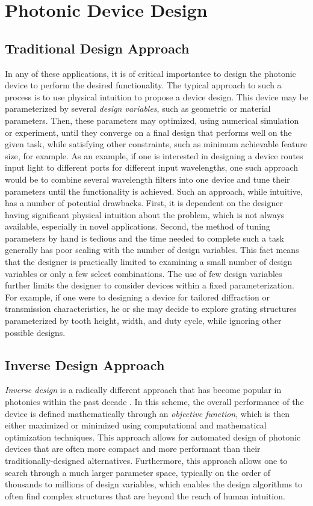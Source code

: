 \section{Photonic Device Design}

\subsection{Traditional Design Approach}

In any of these applications, it is of critical importantce to design the photonic device to perform the desired functionality.
The typical approach to such a process is to use physical intuition to propose a device design.
This device may be parameterized by several \textit{design variables}, such as geometric or material parameters.
Then, these parameters may optimized, using numerical simulation or experiment, until they converge on a final design that performs well on the given task, while satisfying other constraints, such as minimum achievable feature size, for example.
As an example, if one is interested in designing a device routes input light to different ports for different input wavelengths, one such approach would be to combine several wavelength filters into one device and tune their parameters until the functionality is achieved.
Such an approach, while intuitive, has a number of potential drawbacks.
First, it is dependent on the designer having significant physical intuition about the problem, which is not always available, especially in novel applications.
Second, the method of tuning parameters by hand is tedious and the time needed to complete such a task generally has poor scaling with the number of design variables.
This fact means that the designer is practically limited to examining a small number of design variables or only a few select combinations.
The use of few design variables further limits the designer to consider devices within a fixed parameterization.
For example, if one were to designing a device for tailored diffraction or transmission characteristics, he or she may decide to explore grating structures parameterized by tooth height, width, and duty cycle, while ignoring other possible designs.

\subsection{Inverse Design Approach}

\textit{Inverse design} is a radically different approach that has become popular in photonics within the past decade \cite{molesky_inverse_2018}.  
In this scheme, the overall performance of the device is defined mathematically through an \textit{objective function}, which is then either maximized or minimized using computational and mathematical optimization techniques.
This approach allows for automated design of photonic devices that are often more compact and more performant than their traditionally-designed alternatives.
Furthermore, this approach allows one to search through a much larger parameter space, typically on the order of thousands to millions of design variables, which enables the design algorithms to often find complex structures that are beyond the reach of human intuition.

